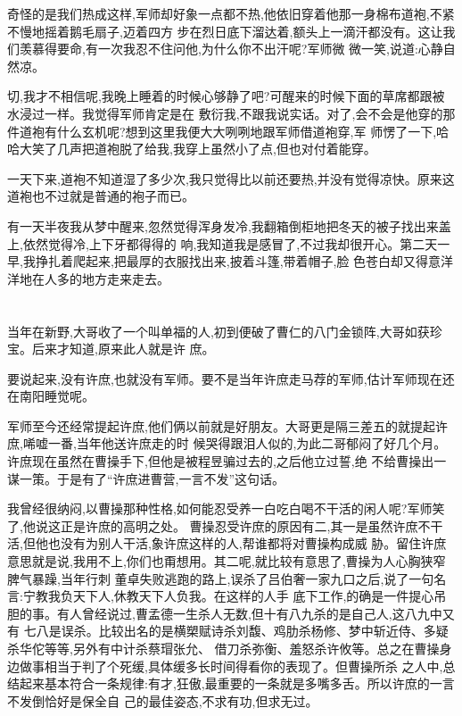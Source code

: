 ﻿\documentclass[12pt,twocolumn]{article}
\begin{document}
奇怪的是我们热成这样,军师却好象一点都不热,他依旧穿着他那一身棉布道袍,不紧不慢地摇着鹅毛扇子,迈着四方
步在烈日底下溜达着,额头上一滴汗都没有。这让我们羡慕得要命,有一次我忍不住问他,为什么你不出汗呢?军师微
微一笑,说道:心静自然凉。

切,我才不相信呢,我晚上睡着的时候心够静了吧?可醒来的时候下面的草席都跟被水浸过一样。我觉得军师肯定是在
敷衍我,不跟我说实话。对了,会不会是他穿的那件道袍有什么玄机呢?想到这里我便大大咧咧地跟军师借道袍穿,军
师愣了一下,哈哈大笑了几声把道袍脱了给我,我穿上虽然小了点,但也对付着能穿。

一天下来,道袍不知道湿了多少次,我只觉得比以前还要热,并没有觉得凉快。原来这道袍也不过就是普通的袍子而已。

有一天半夜我从梦中醒来,忽然觉得浑身发冷,我翻箱倒柜地把冬天的被子找出来盖上,依然觉得冷,上下牙都得得的
响,我知道我是感冒了,不过我却很开心。第二天一早,我挣扎着爬起来,把最厚的衣服找出来,披着斗篷,带着帽子,脸
色苍白却又得意洋洋地在人多的地方走来走去。

\section{}

当年在新野,大哥收了一个叫单福的人,初到便破了曹仁的八门金锁阵,大哥如获珍宝。后来才知道,原来此人就是许
庶。

要说起来,没有许庶,也就没有军师。要不是当年许庶走马荐的军师,估计军师现在还在南阳睡觉呢。

军师至今还经常提起许庶,他们俩以前就是好朋友。大哥更是隔三差五的就提起许庶,唏嘘一番,当年他送许庶走的时
候哭得跟泪人似的,为此二哥郁闷了好几个月。许庶现在虽然在曹操手下,但他是被程昱骗过去的,之后他立过誓,绝
不给曹操出一谋一策。于是有了``许庶进曹营,一言不发''这句话。

我曾经很纳闷,以曹操那种性格,如何能忍受养一白吃白喝不干活的闲人呢?军师笑了,他说这正是许庶的高明之处。
曹操忍受许庶的原因有二,其一是虽然许庶不干活,但他也没有为别人干活,象许庶这样的人,帮谁都将对曹操构成威
胁。留住许庶意思就是说,我用不上,你们也甭想用。其二呢,就比较有意思了,曹操为人心胸狭窄脾气暴躁,当年行刺
董卓失败逃跑的路上,误杀了吕伯奢一家九口之后,说了一句名言:宁教我负天下人,休教天下人负我。在这样的人手
底下工作,的确是一件提心吊胆的事。有人曾经说过,曹孟德一生杀人无数,但十有八九杀的是自己人,这八九中又有
七八是误杀。比较出名的是横槊赋诗杀刘馥、鸡肋杀杨修、梦中斩近侍、多疑杀华佗等等,另外有中计杀蔡瑁张允、
借刀杀弥衡、羞怒杀许攸等。总之在曹操身边做事相当于判了个死缓,具体缓多长时间得看你的表现了。但曹操所杀
之人中,总结起来基本符合一条规律:有才,狂傲,最重要的一条就是多嘴多舌。所以许庶的一言不发倒恰好是保全自
己的最佳姿态,不求有功,但求无过。
\end{document}
